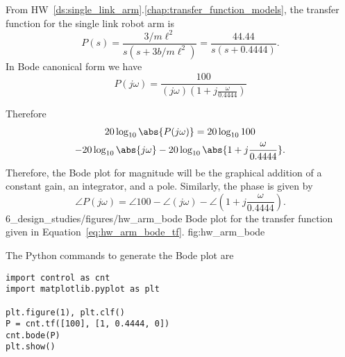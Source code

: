 From HW~\ref{ds:single_link_arm}.\ref{chap:transfer_function_models}, the transfer function for the single link robot arm is 
\begin{equation}\label{eq:hw_arm_bode_tf}
P(s) = \frac{3/m\ell^2}{s(s+3b/m\ell^2)} = \frac{44.44}{s(s+0.4444)}.
\end{equation}
In Bode canonical form we have
\[
P(j\omega) = \frac{100}{(j\omega)(1+j\frac{\omega}{0.4444})}
\]

Therefore
\begin{multline}\label{eq:loop_bode_example2}
20\log_{10}\abs{P(j\omega)}= 
	20\log_{10} 100 \\
	-20\log_{10}\abs{j\omega}
	-20\log_{10}\abs{1+j\frac{\omega}{0.4444}}.
\end{multline}
Therefore, the Bode plot for magnitude will be the graphical addition of a constant gain, an integrator, and a pole.
Similarly, the phase is given by
\[
\angle P(j\omega) = 
	\angle 100 
	- \angle (j\omega)
	- \angle (1+j\frac{\omega}{0.4444}).
\]
	{6_design_studies/figures/hw_arm_bode}
	{Bode plot for the transfer function given in Equation~\eqref{eq:hw_arm_bode_tf}.}
	{fig:hw_arm_bode}

The Python commands to generate the Bode plot are 
\begin{lstlisting}
import control as cnt
import matplotlib.pyplot as plt

plt.figure(1), plt.clf()
P = cnt.tf([100], [1, 0.4444, 0])
cnt.bode(P)
plt.show()
\end{lstlisting}
